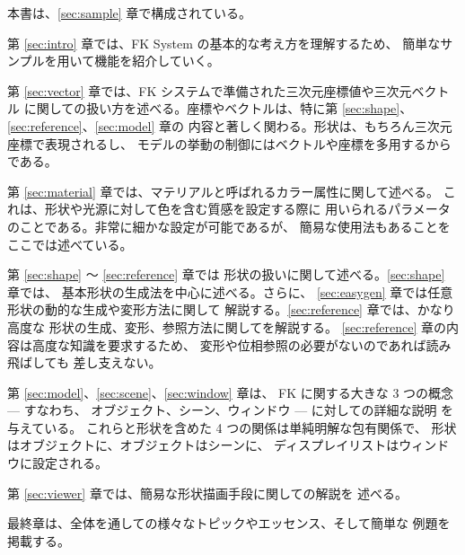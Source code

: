 本書は、\ref{sec:sample} 章で構成されている。

第 \ref{sec:intro} 章では、FK System の基本的な考え方を理解するため、
簡単なサンプルを用いて機能を紹介していく。

第 \ref{sec:vector} 章では、FK システムで準備された三次元座標値や三次元ベクトル
に関しての扱い方を述べる。座標やベクトルは、特に第 \ref{sec:shape}、
\ref{sec:reference}、\ref{sec:model} 章の
内容と著しく関わる。形状は、もちろん三次元座標で表現されるし、
モデルの挙動の制御にはベクトルや座標を多用するからである。

第 \ref{sec:material} 章では、マテリアルと呼ばれるカラー属性に関して述べる。
これは、形状や光源に対して色を含む質感を設定する際に
用いられるパラメータのことである。非常に細かな設定が可能であるが、
簡易な使用法もあることをここでは述べている。

第 \ref{sec:shape} 〜 \ref{sec:reference} 章では
形状の扱いに関して述べる。\ref{sec:shape} 章では、
基本形状の生成法を中心に述べる。さらに、
\ref{sec:easygen} 章では任意形状の動的な生成や変形方法に関して
解説する。\ref{sec:reference} 章では、かなり高度な
形状の生成、変形、参照方法に関してを解説する。
\ref{sec:reference} 章の内容は高度な知識を要求するため、
変形や位相参照の必要がないのであれば読み飛ばしても
差し支えない。

第 \ref{sec:model}、\ref{sec:scene}、\ref{sec:window} 章は、
FK に関する大きな 3 つの概念 --- すなわち、
オブジェクト、シーン、ウィンドウ --- に対しての詳細な説明
を与えている。
これらと形状を含めた 4 つの関係は単純明解な包有関係で、
形状はオブジェクトに、オブジェクトはシーンに、
ディスプレイリストはウィンドウに設定される。

第 \ref{sec:viewer} 章では、簡易な形状描画手段に関しての解説を
述べる。

最終章は、全体を通しての様々なトピックやエッセンス、そして簡単な
例題を掲載する。
